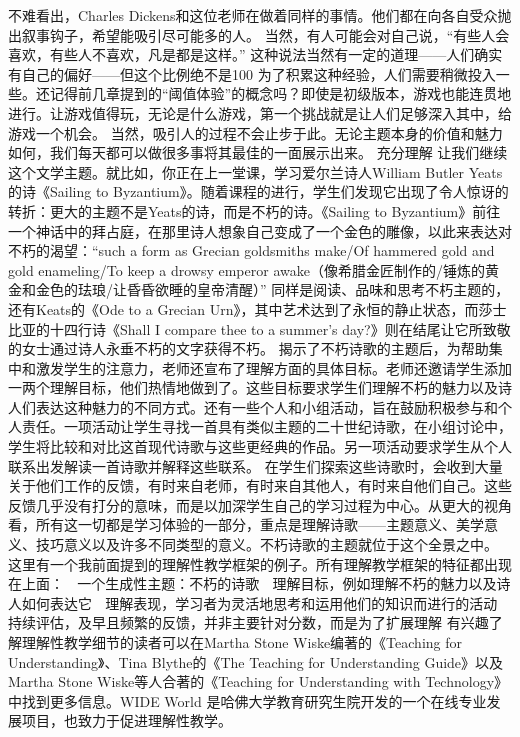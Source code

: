 不难看出，Charles Dickens和这位老师在做着同样的事情。他们都在向各自受众抛出叙事钩子，希望能吸引尽可能多的人。
当然，有人可能会对自己说，“有些人会喜欢，有些人不喜欢，凡是都是这样。” 这种说法当然有一定的道理——人们确实有自己的偏好——但这个比例绝不是100%
为了积累这种经验，人们需要稍微投入一些。还记得前几章提到的“阈值体验”的概念吗？即使是初级版本，游戏也能连贯地进行。让游戏值得玩，无论是什么游戏，第一个挑战就是让人们足够深入其中，给游戏一个机会。
当然，吸引人的过程不会止步于此。无论主题本身的价值和魅力如何，我们每天都可以做很多事将其最佳的一面展示出来。
充分理解
让我们继续这个文学主题。就比如，你正在上一堂课，学习爱尔兰诗人William Butler Yeats的诗《Sailing to Byzantium》。随着课程的进行，学生们发现它出现了令人惊讶的转折：更大的主题不是Yeats的诗，而是不朽的诗。《Sailing to Byzantium》前往一个神话中的拜占庭，在那里诗人想象自己变成了一个金色的雕像，以此来表达对不朽的渴望：“such a form as Grecian goldsmiths make/Of hammered gold and gold enameling/To keep a drowsy emperor awake（像希腊金匠制作的/锤炼的黄金和金色的珐琅/让昏昏欲睡的皇帝清醒）” 同样是阅读、品味和思考不朽主题的，还有Keats的《Ode to a Grecian Urn》，其中艺术达到了永恒的静止状态，而莎士比亚的十四行诗《Shall I compare thee to a summer’s day?》则在结尾让它所致敬的女士通过诗人永垂不朽的文字获得不朽。
揭示了不朽诗歌的主题后，为帮助集中和激发学生的注意力，老师还宣布了理解方面的具体目标。老师还邀请学生添加一两个理解目标，他们热情地做到了。这些目标要求学生们理解不朽的魅力以及诗人们表达这种魅力的不同方式。还有一些个人和小组活动，旨在鼓励积极参与和个人责任。一项活动让学生寻找一首具有类似主题的二十世纪诗歌，在小组讨论中，学生将比较和对比这首现代诗歌与这些更经典的作品。另一项活动要求学生从个人联系出发解读一首诗歌并解释这些联系。
在学生们探索这些诗歌时，会收到大量关于他们工作的反馈，有时来自老师，有时来自其他人，有时来自他们自己。这些反馈几乎没有打分的意味，而是以加深学生自己的学习过程为中心。从更大的视角看，所有这一切都是学习体验的一部分，重点是理解诗歌——主题意义、美学意义、技巧意义以及许多不同类型的意义。不朽诗歌的主题就位于这个全景之中。
这里有一个我前面提到的理解性教学框架的例子。所有理解教学框架的特征都出现在上面：
	一个生成性主题：不朽的诗歌
	理解目标，例如理解不朽的魅力以及诗人如何表达它
	理解表现，学习者为灵活地思考和运用他们的知识而进行的活动
	持续评估，及早且频繁的反馈，并非主要针对分数，而是为了扩展理解
有兴趣了解理解性教学细节的读者可以在Martha Stone Wiske编著的《Teaching for Understanding》、Tina Blythe的《The Teaching for Understanding Guide》以及Martha Stone Wiske等人合著的《Teaching for Understanding with Technology》中找到更多信息。WIDE World 是哈佛大学教育研究生院开发的一个在线专业发展项目，也致力于促进理解性教学。
